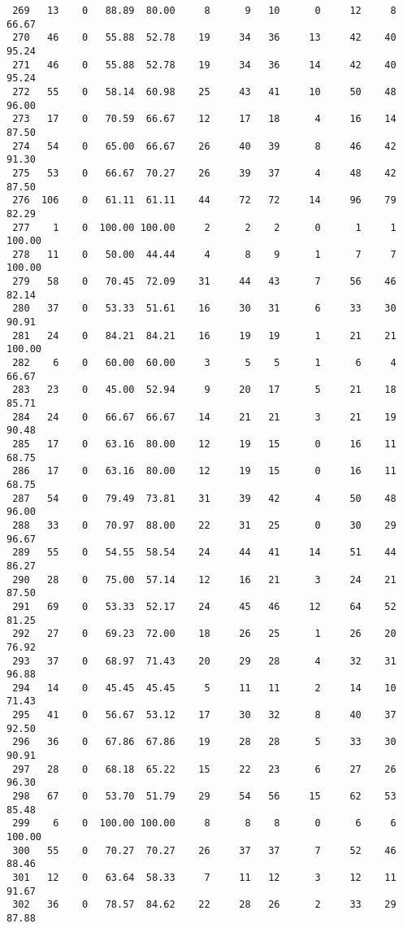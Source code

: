 \begin{verbatim}
 269   13    0   88.89  80.00     8      9   10      0     12     8    66.67
 270   46    0   55.88  52.78    19     34   36     13     42    40    95.24
 271   46    0   55.88  52.78    19     34   36     14     42    40    95.24
 272   55    0   58.14  60.98    25     43   41     10     50    48    96.00
 273   17    0   70.59  66.67    12     17   18      4     16    14    87.50
 274   54    0   65.00  66.67    26     40   39      8     46    42    91.30
 275   53    0   66.67  70.27    26     39   37      4     48    42    87.50
 276  106    0   61.11  61.11    44     72   72     14     96    79    82.29
 277    1    0  100.00 100.00     2      2    2      0      1     1   100.00
 278   11    0   50.00  44.44     4      8    9      1      7     7   100.00
 279   58    0   70.45  72.09    31     44   43      7     56    46    82.14
 280   37    0   53.33  51.61    16     30   31      6     33    30    90.91
 281   24    0   84.21  84.21    16     19   19      1     21    21   100.00
 282    6    0   60.00  60.00     3      5    5      1      6     4    66.67
 283   23    0   45.00  52.94     9     20   17      5     21    18    85.71
 284   24    0   66.67  66.67    14     21   21      3     21    19    90.48
 285   17    0   63.16  80.00    12     19   15      0     16    11    68.75
 286   17    0   63.16  80.00    12     19   15      0     16    11    68.75
 287   54    0   79.49  73.81    31     39   42      4     50    48    96.00
 288   33    0   70.97  88.00    22     31   25      0     30    29    96.67
 289   55    0   54.55  58.54    24     44   41     14     51    44    86.27
 290   28    0   75.00  57.14    12     16   21      3     24    21    87.50
 291   69    0   53.33  52.17    24     45   46     12     64    52    81.25
 292   27    0   69.23  72.00    18     26   25      1     26    20    76.92
 293   37    0   68.97  71.43    20     29   28      4     32    31    96.88
 294   14    0   45.45  45.45     5     11   11      2     14    10    71.43
 295   41    0   56.67  53.12    17     30   32      8     40    37    92.50
 296   36    0   67.86  67.86    19     28   28      5     33    30    90.91
 297   28    0   68.18  65.22    15     22   23      6     27    26    96.30
 298   67    0   53.70  51.79    29     54   56     15     62    53    85.48
 299    6    0  100.00 100.00     8      8    8      0      6     6   100.00
 300   55    0   70.27  70.27    26     37   37      7     52    46    88.46
 301   12    0   63.64  58.33     7     11   12      3     12    11    91.67
 302   36    0   78.57  84.62    22     28   26      2     33    29    87.88

\end{verbatim}

